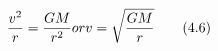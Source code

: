 \begin{equation*}
\frac{v^{2}}{r} = \frac{GM}{r^{2}} or \newline
v = \sqrt{\frac{GM}{r}} \tag{4.6}
\end{equation*}
